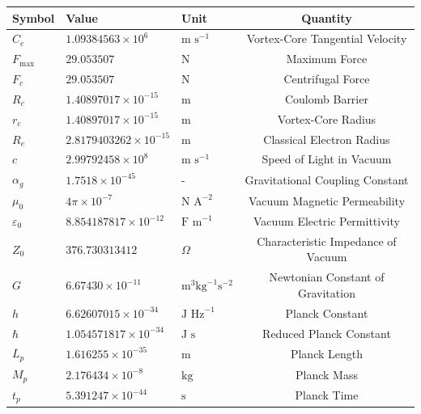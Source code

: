 \documentclass[a4paper,10pt]{article}
\begin{document}
    \begin{table}[h]
        \centering
        \renewcommand{\arraystretch}{1.2}
        \begin{tabular}{lllc}
            \toprule
            \textbf{Symbol} & \textbf{Value} & \textbf{Unit} & \textbf{Quantity} \\
            \midrule
            $C_e$ & $1.09384563 \times 10^6$ & $\text{m s}^{-1}$ & Vortex-Core Tangential Velocity \\
            $F_{\text{max}}$ & $29.053507$ & $\text{N}$ & Maximum Force \\
            $F_c$ & $29.053507$ & $\text{N}$ & Centrifugal Force \\
            $R_c$ & $1.40897017 \times 10^{-15}$ & $\text{m}$ & Coulomb Barrier \\
            $r_c$ & $1.40897017 \times 10^{-15}$ & $\text{m}$ & Vortex-Core Radius \\
            $R_e$ & $2.8179403262 \times 10^{-15}$ & $\text{m}$ & Classical Electron Radius \\
            $c$ & $2.99792458 \times 10^8$ & $\text{m s}^{-1}$ & Speed of Light in Vacuum \\
            $\alpha_g$ & $1.7518 \times 10^{-45}$ & - & Gravitational Coupling Constant \\
            $\mu_0$ & $4\pi \times 10^{-7}$ & $\text{N A}^{-2}$ & Vacuum Magnetic Permeability \\
            $\varepsilon_0$ & $8.854187817 \times 10^{-12}$ & $\text{F m}^{-1}$ & Vacuum Electric Permittivity \\
            $Z_0$ & $376.730313412$ & $\Omega$ & Characteristic Impedance of Vacuum \\
            $G$ & $6.67430 \times 10^{-11}$ & $\text{m}^3 \text{kg}^{-1} \text{s}^{-2}$ & Newtonian Constant of Gravitation \\
            $h$ & $6.62607015 \times 10^{-34}$ & $\text{J Hz}^{-1}$ & Planck Constant \\
            $\hbar$ & $1.054571817 \times 10^{-34}$ & $\text{J s}$ & Reduced Planck Constant \\
            $L_p$ & $1.616255 \times 10^{-35}$ & $\text{m}$ & Planck Length \\
            $M_p$ & $2.176434 \times 10^{-8}$ & $\text{kg}$ & Planck Mass \\
            $t_p$ & $5.391247 \times 10^{-44}$ & $\text{s}$ & Planck Time \\

\end{tabular}
\end{table}
\end{document}

